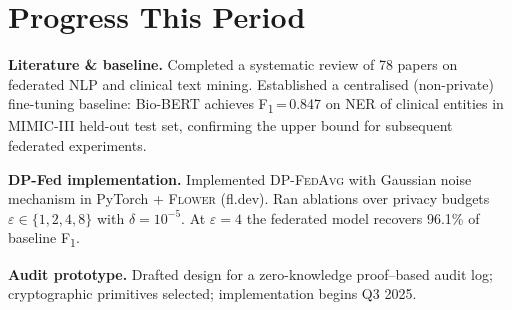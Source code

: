 \section{Progress This Period}

\textbf{Literature \& baseline.}\enspace
Completed a systematic review of 78 papers on federated NLP and clinical text mining.
Established a centralised (non-private) fine-tuning baseline: Bio-BERT achieves
F\textsubscript{1}\,=\,0.847 on NER of clinical entities in MIMIC-III held-out test
set, confirming the upper bound for subsequent federated experiments.

\textbf{DP-Fed implementation.}\enspace
Implemented \textsc{DP-FedAvg} with Gaussian noise mechanism in PyTorch +
\textsc{Flower} (fl.dev). Ran ablations over privacy budgets
$\varepsilon \in \{1, 2, 4, 8\}$ with $\delta = 10^{-5}$.
At $\varepsilon = 4$ the federated model recovers 96.1\% of baseline F\textsubscript{1}.

\textbf{Audit prototype.}\enspace
Drafted design for a zero-knowledge proof–based audit log;
cryptographic primitives selected; implementation begins Q3 2025.

